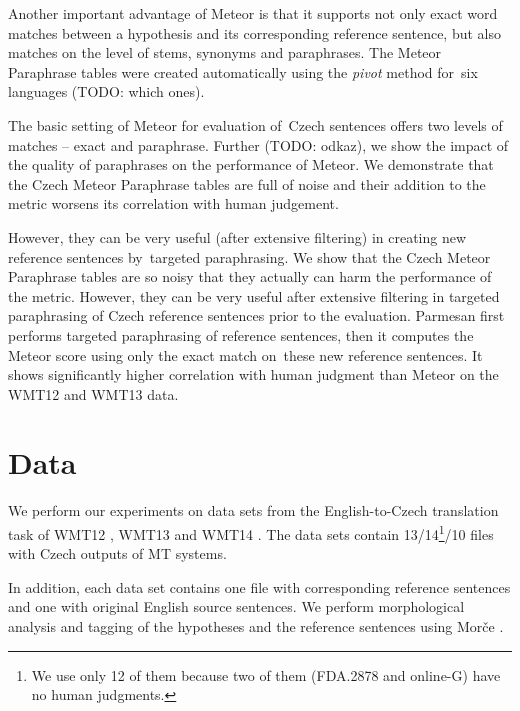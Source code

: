 \documentclass[11pt]{article}
\begin{document}
Another important advantage of Meteor is that it supports not only exact word matches 
between a hypothesis and its corresponding reference sentence, but also matches on the 
level of stems, synonyms and paraphrases. The Meteor Paraphrase tables \cite{meteor-tables} 
were created automatically using the \textit{pivot} method \cite{pivoting} for~six languages 
(TODO: which ones).

The basic setting of Meteor for evaluation of~Czech sentences offers two levels of matches -- 
exact and paraphrase. Further (TODO: odkaz), we show the impact of the quality of paraphrases 
on the performance of Meteor. We demonstrate that the Czech Meteor Paraphrase tables are full 
of noise and their addition to the metric worsens its correlation with human judgement. 

However, they can be very useful (after extensive filtering) in creating new reference sentences 
by~targeted paraphrasing. 
We show that the Czech Meteor Paraphrase tables are so noisy that they actually can harm 
the performance of the metric. However, they can be very useful after extensive filtering 
in targeted paraphrasing of Czech reference sentences prior to the evaluation.
Parmesan first performs targeted paraphrasing of reference sentences, then it computes 
the Meteor score using only the exact match on~these new reference sentences. It shows 
significantly higher correlation with human judgment than Meteor on the WMT12 and WMT13 data. 

\section{Data}
We perform our experiments on data sets from the English-to-Czech translation 
task of WMT12 \cite{wmt12}, WMT13 \cite{wmt13} and WMT14 \cite{wmt14}. The data 
sets contain 13/14\footnote{We use only 12 of them because two of them (FDA.2878 
and online-G) have no human judgments.}/10 files with Czech outputs of MT systems.

In addition, each data set contains one file with corresponding reference sentences 
and one with original English source sentences. We perform morphological analysis 
and tagging of the hypotheses and the reference sentences using Morče \cite{morce:2007}.
\end{document}
